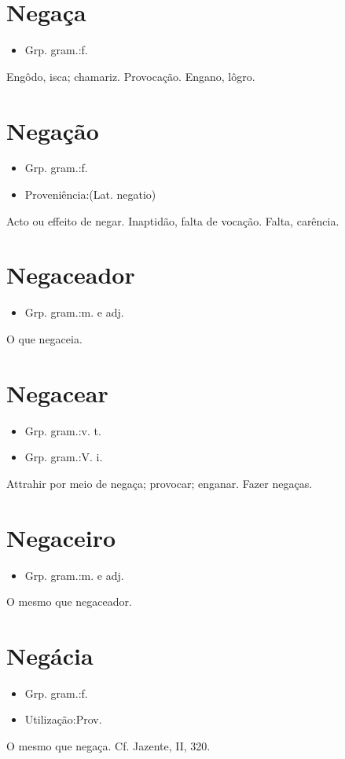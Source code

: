 \section{Negaça}
\begin{itemize}
\item {Grp. gram.:f.}
\end{itemize}
Engôdo, isca; chamariz.
Provocação.
Engano, lôgro.
\section{Negação}
\begin{itemize}
\item {Grp. gram.:f.}
\end{itemize}
\begin{itemize}
\item {Proveniência:(Lat. \textunderscore negatio\textunderscore )}
\end{itemize}
Acto ou effeito de negar.
Inaptidão, falta de vocação.
Falta, carência.
\section{Negaceador}
\begin{itemize}
\item {Grp. gram.:m.  e  adj.}
\end{itemize}
O que negaceia.
\section{Negacear}
\begin{itemize}
\item {Grp. gram.:v. t.}
\end{itemize}
\begin{itemize}
\item {Grp. gram.:V. i.}
\end{itemize}
Attrahir por meio de negaça; provocar; enganar.
Fazer negaças.
\section{Negaceiro}
\begin{itemize}
\item {Grp. gram.:m.  e  adj.}
\end{itemize}
O mesmo que \textunderscore negaceador\textunderscore .
\section{Negácia}
\begin{itemize}
\item {Grp. gram.:f.}
\end{itemize}
\begin{itemize}
\item {Utilização:Prov.}
\end{itemize}
O mesmo que \textunderscore negaça\textunderscore . Cf. Jazente, II, 320.
